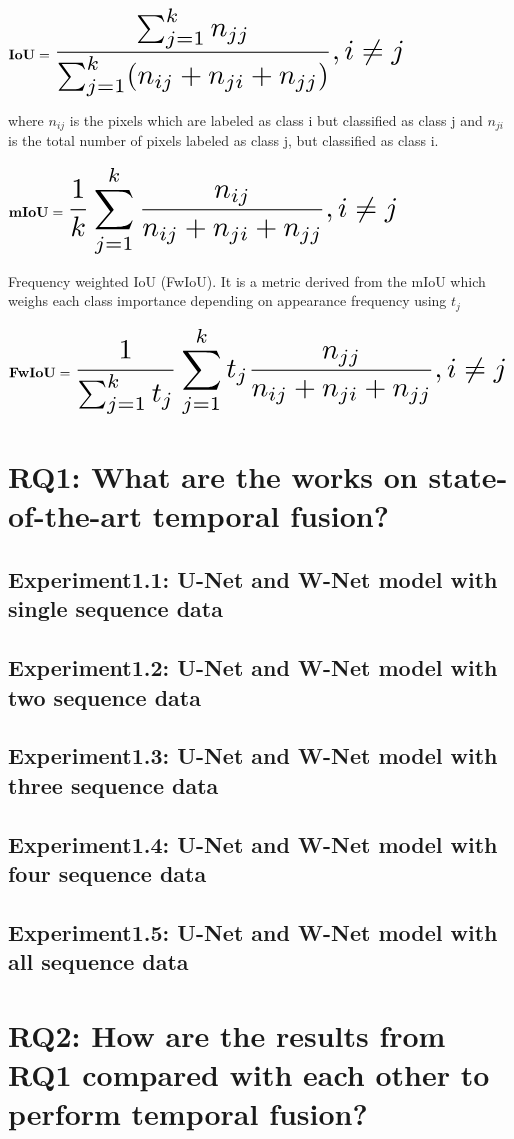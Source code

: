	$
	{\bf IoU} = \scalemath{2}{\frac{\sum_{j=1}^{k} n_{jj}}{\sum_{j=1}^{k} (n_{ij}+n_{ji}+n_{jj})}, i \neq j }
	$

	where $ n_{ij}$ is the pixels which are labeled as class i but classified as class j and $n_{ji}$ is the total number of pixels labeled as class j, but classified as class i. \cite{84_ulku2022survey}
	
	$
	{\bf mIoU} = \scalemath{2}{\frac{1}{k} \sum_{j=1}^k \frac{n_{ij}}{n_{ij}+n_{ji}+n_{jj}},  i \neq j }
	$
	
	Frequency weighted IoU (FwIoU). It is a metric derived from the mIoU which weighs each class importance depending on appearance frequency using $t_j$ \cite{84_ulku2022survey}
	
	$
	{\bf FwIoU} = \scalemath{2} {\frac{1}{\sum_{j=1}^k t_j} \sum_{j=1}^{k} t_j \frac{n_{jj}}{n_{ij}+n_{ji}+n_{jj}}, i \neq j }
	$
    
    
    \section{RQ1: What are the works on state-of-the-art temporal fusion?}
    \subsection{Experiment1.1: U-Net and W-Net model with single sequence data}
    \subsection{Experiment1.2: U-Net and W-Net model with two sequence data}
    \subsection{Experiment1.3: U-Net and W-Net model with three sequence data}
    \subsection{Experiment1.4: U-Net and W-Net model with four sequence data}
    \subsection{Experiment1.5: U-Net and W-Net model with all sequence data}
    \section{RQ2: How are the results from RQ1 compared with each other to perform temporal fusion?}
